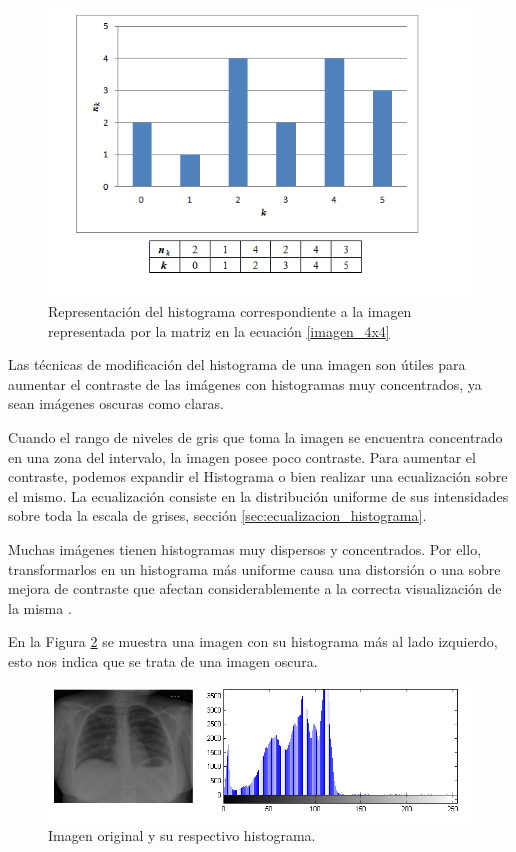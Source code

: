 \begin{figure}[H]
    \includegraphics[width=14cm] {representacion_histograma.png}
    \caption{Representación del histograma correspondiente a la imagen representada por la matriz en la ecuación \ref{imagen_4x4}}
    \label{representacion_histograma}
\end{figure}

Las técnicas de modificación del histograma de una imagen son útiles para aumentar el contraste de las imágenes con histogramas muy concentrados, ya sean imágenes oscuras como claras. 

Cuando el rango de niveles de gris que toma la imagen se encuentra concentrado en una zona del intervalo, la imagen posee poco contraste. Para aumentar el contraste, podemos expandir el Histograma o bien realizar una ecualización sobre el mismo. La ecualización consiste en la distribución uniforme de sus intensidades sobre toda la escala de grises, sección \ref{sec:ecualizacion_histograma}.

Muchas imágenes tienen histogramas muy dispersos y concentrados. Por ello, transformarlos en un histograma más uniforme causa una distorsión o una sobre mejora de contraste que afectan considerablemente a la correcta visualización de la misma \cite{PTS+13}.

En la Figura \ref{imagen25_hist_ori} se muestra una imagen con su histograma más al lado izquierdo, esto nos indica que se trata de una imagen oscura.

\begin{figure}[H]
    \includegraphics[width=15cm]{imagen25_Hist_Ori.png}
    \caption{Imagen original y su respectivo histograma.}
    \label{imagen25_hist_ori}
\end{figure}

